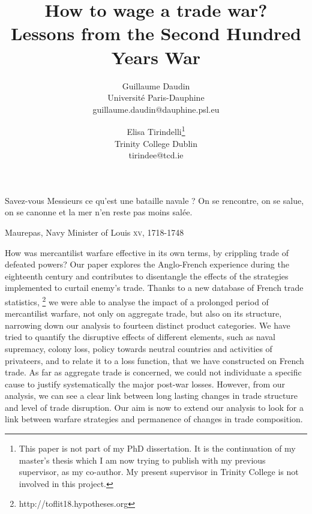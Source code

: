 \documentclass[12pt,a4paper,notitlepage]{article}
\begin{document}
\title{How to wage a trade war? \\
Lessons from the Second Hundred Years War}
\author{
  Guillaume Daudin \\ Université Paris-Dauphine \\guillaume.daudin@dauphine.psl.eu		
  \and
  Elisa Tirindelli\footnote{This paper is not part of my PhD dissertation. It is the continuation of my master's thesis which I am now trying to publish with my previous supervisor, as my co-author. My present supervisor in Trinity College is not involved in this project.} \\ Trinity College Dublin  \\ tirindee@tcd.ie
}
\date{}
\maketitle


\epigraph{Savez-vous Messieurs ce qu’est une bataille navale ? On se rencontre, on se salue, on se canonne et la mer n’en reste pas moins salée.}{Maurepas, Navy Minister of Louis  \textsc{xv}, 1718-1748}

How was mercantilist warfare effective in its own terms, by crippling trade of defeated powers?
Our paper explores the Anglo-French experience during the eighteenth century and contributes to disentangle the effects of the strategies implemented to curtail enemy's trade. Thanks to a new database of French trade statistics,
\footnote{http://toflit18.hypotheses.org} we were able to analyse the impact of a prolonged period of mercantilist warfare, not only on aggregate trade, but also on its structure, narrowing down our analysis to fourteen distinct product categories. We have tried to quantify the disruptive effects of different elements, such as naval supremacy, colony loss, policy towards neutral countries and activities of privateers, and to relate it to a loss function, that we have constructed on French trade. As far as aggregate trade is concerned, we could not individuate a specific cause to justify systematically the major post-war losses. However, from our analysis, we can see a clear link between long lasting changes in trade structure and level of trade disruption. Our aim is now to extend our analysis to look for a link between warfare strategies and permanence of changes in trade composition.  \\
\end{document}
